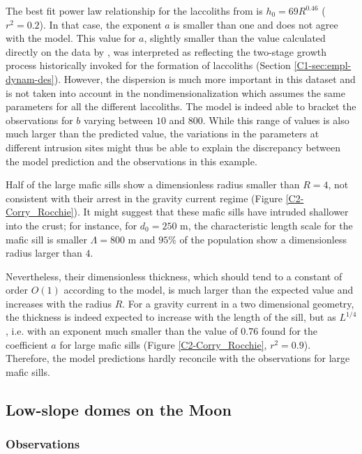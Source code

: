 The  best  fit   power  law  relationship  for   the  laccoliths  from
\citet{E:2015tl} is  $h_0 = 69  R^{0.46}$ ($r^2 =0.2$). In  that case,
the  exponent $a$  is smaller  than one  and does  not agree  with the
model.  This value for $a$, slightly smaller than the value calculated
directly on  the data by \citet{McCaffrey:1997ea},  was interpreted as
reflecting the  two-stage growth process historically  invoked for the
formation   of   laccoliths   (Section   \ref{C1-sec:empl-dynam-des}).
However, the dispersion is much more  important in this dataset and is
not taken into account in  the nondimensionalization which assumes the
same parameters for all the different laccoliths.  The model is indeed
able  to bracket  the observations  for $b$  varying between  $10$ and
$800$.   While this  range  of values  is also  much  larger than  the
predicted  value,  the  variations  in  the  parameters  at  different
intrusion sites might thus be  able to explain the discrepancy between
the model prediction and the observations in this example.

Half of the large mafic sills show a dimensionless radius smaller than
$R=4$, not consistent with their  arrest in the gravity current regime
(Figure \ref{C2-Corry_Rocchie}).   It might  suggest that  these mafic
sills  have  intruded shallower  into  the  crust; for  instance,  for
$d_0=250$ m,  the characteristic  length scale for  the mafic  sill is
smaller   $\Lambda=800$  m   and   $95\%$  of   the  population   show
a dimensionless radius larger than $4$.  

Nevertheless, their  dimensionless thickness,  which should tend  to a
constant of order  $O(1)$ according to the model, is  much larger than
the expected value  and increases with the radius $R$.   For a gravity
current  in  a  two  dimensional geometry,  the  thickness  is  indeed
expected to  increase with the  length of  the sill, but  as $L^{1/4}$
\citep{Michaut:2011kg}, i.e.  with an  exponent much smaller  than the
value of  $0.76$ found for the  coefficient $a$ for large  mafic sills
(Figure  \ref{C2-Corry_Rocchie},  $r^2=0.9$).   Therefore,  the  model
predictions  hardly reconcile  with the  observations for  large mafic
sills.


\subsection{Low-slope domes on the Moon}
\label{C2-sec:observ-vs-pred}

\subsubsection*{Observations}

